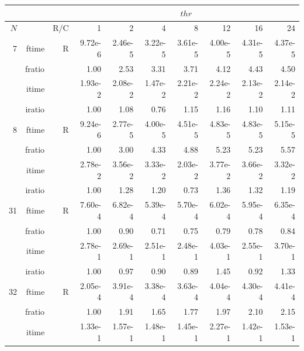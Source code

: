 \documentclass[a4paper]{article}
\begin{document}
\begin{table}[htbp]
\begin{center}
\begin{small}
\begin{tabular}{|r|r|r|r|r|r|r|r|r|r|}
\hline 
     \multicolumn{3}{|c|}{ } & \multicolumn{7}{c|}{$thr$} \\ \hline
    $N$  & & R/C  & 1           & 2    & 4    & 8    & 12   & 16    & 24  \\ \hline\hline
    7  & ftime & R  &  9.72e-6 &   2.46e-5 &   3.22e-5 &   3.61e-5 &   4.00e-5 &   4.31e-5 &   4.37e-5     \\ 
    & fratio & &       1.00 &   2.53 &   3.31 &   3.71 &   4.12 &   4.43 &   4.50    \\ 
     & itime & &       1.93e-2 &   2.08e-2 &   1.47e-2 &   2.21e-2 &   2.24e-2 &   2.13e-2 &   2.14e-2        \\ 
     & iratio & &      1.00 &   1.08 &   0.76 &   1.15 &   1.16 &   1.10 &   1.11         \\ \hline 
    8  & ftime & R  &  9.24e-6 &   2.77e-5 &   4.00e-5 &   4.51e-5 &   4.83e-5 &   4.83e-5 &   5.15e-5     \\ 
      & fratio & &     1.00 &   3.00 &   4.33 &   4.88 &   5.23 &   5.23 &   5.57      \\ 
     & itime & &       2.78e-2 &   3.56e-2 &   3.33e-2 &   2.03e-2 &   3.77e-2 &   3.66e-2 &   3.32e-2        \\ 
     & iratio & &      1.00 &   1.28 &   1.20 &   0.73 &   1.36 &   1.32 &   1.19        \\ \hline 
   31  & ftime & R  &  7.60e-4 &   6.82e-4 &   5.39e-4 &   5.70e-4 &   6.02e-4 &   5.95e-4 &   6.35e-4    \\ 
      & fratio & &     1.00 &   0.90 &   0.71 &   0.75 &   0.79 &   0.78 &   0.84       \\ 
     & itime & &       2.78e-1 &   2.69e-1 &   2.51e-1 &   2.48e-1 &   4.03e-1 &   2.55e-1 &   3.70e-1       \\ 
     & iratio & &      1.00 &   0.97 &   0.90 &   0.89 &   1.45 &   0.92 &   1.33       \\ \hline 
   32  & ftime & R  &  2.05e-4 &   3.91e-4 &   3.38e-4 &   3.63e-4 &   4.04e-4 &   4.30e-4 &   4.41e-4    \\ 
      & fratio & &     1.00 &   1.91 &   1.65 &   1.77 &   1.97 &   2.10 &   2.15        \\ 
     & itime & &       1.33e-1 &   1.57e-1 &   1.48e-1 &   1.45e-1 &   2.27e-1 &   1.42e-1 &   1.53e-1        \\ 

\end{tabular}
\end{small}
\end{center}
\end{table}
\end{document}
